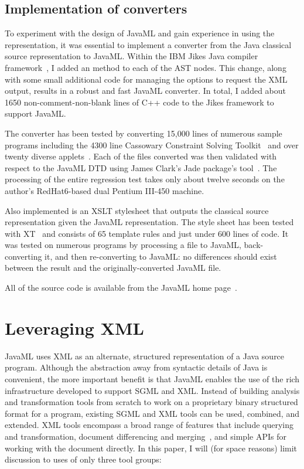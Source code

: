 \documentclass{article}
\begin{document}
\begin{multicols}{2}
\subsection{Implementation of converters}

To experiment with the design of JavaML and gain experience in using the
representation, it was essential to implement a converter from the Java
classical source representation to JavaML.  Within the IBM Jikes Java
compiler framework~\cite{Jikes}, I added an  method
to each of the AST nodes. This change, along with some small additional
code for managing the options to request the XML output, results in a
robust and fast JavaML converter.  In total, I added about 1650
non-comment-non-blank lines of C++ code to the Jikes framework to
support JavaML.

The converter has been tested by converting 15,000 lines of numerous
sample programs including the 4300 line Cassowary Constraint Solving
Toolkit~\cite{CassoInI} and over twenty diverse applets~\cite{SunApplets}.  Each of
the files converted was then validated with respect to the JavaML DTD
using James Clark's Jade package's  tool~\cite{Jade}.
The processing of the entire regression test takes only about twelve
seconds on the author's RedHat6-based dual Pentium III-450 machine.

Also implemented is an XSLT stylesheet that outputs the classical source
representation given the JavaML representation. The style sheet has been
tested with XT~\cite{Clark-XT} and consists of 65 template rules and
just under 600 lines of code.  It was tested on numerous programs by
processing a file to JavaML, back-converting it, and then re-converting
to JavaML: no differences should exist between the result and the
originally-converted JavaML file.

All of the source code is available from the JavaML home
page~\cite{Badros-javaml}.

\section{Leveraging XML}
\label{sec-leveraging}

JavaML uses XML as an alternate, structured representation of a Java
source program.  Although the abstraction away from syntactic details of
Java is convenient, the more important benefit is that JavaML enables
the use of the rich infrastructure developed to support SGML and XML.
Instead of building analysis and transformation tools from scratch to
work on a proprietary binary structured format for a program, existing
SGML and XML tools can be used, combined, and extended.  XML tools
encompass a broad range of features that include querying and
transformation, document differencing and merging~\cite{XMLDiffMerge},
and simple APIs for working with the document directly.  In this paper,
I will (for space reasons) limit discussion to uses of only three tool
groups:


\end{multicols}
\end{document}
